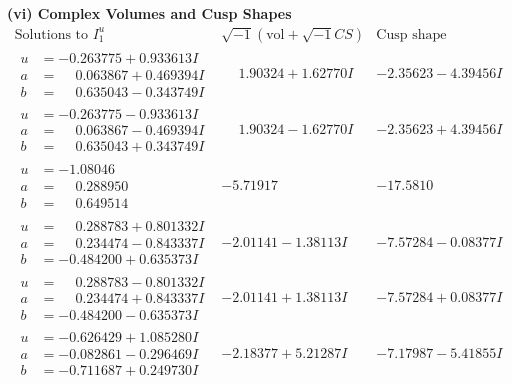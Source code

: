 \documentclass[1p]{elsarticle_modified}
\theoremstyle{definition}
\newcommand{\I}{\sqrt{-1}}
\begin{document}
\newpage\flushleft \textbf{(vi) Complex Volumes and Cusp Shapes}
$$\begin{array}{c|c|c}  
\text{Solutions to }I^u_{1}& \I (\text{vol} + \sqrt{-1}CS) & \text{Cusp shape}\\
 \hline 
\begin{aligned}
u &= -0.263775 + 0.933613 I \\
a &= \phantom{-}0.063867 + 0.469394 I \\
b &= \phantom{-}0.635043 - 0.343749 I\end{aligned}
 & \phantom{-}1.90324 + 1.62770 I & -2.35623 - 4.39456 I \\ \hline\begin{aligned}
u &= -0.263775 - 0.933613 I \\
a &= \phantom{-}0.063867 - 0.469394 I \\
b &= \phantom{-}0.635043 + 0.343749 I\end{aligned}
 & \phantom{-}1.90324 - 1.62770 I & -2.35623 + 4.39456 I \\ \hline\begin{aligned}
u &= -1.08046\phantom{ +0.000000I} \\
a &= \phantom{-}0.288950\phantom{ +0.000000I} \\
b &= \phantom{-}0.649514\phantom{ +0.000000I}\end{aligned}
 & -5.71917\phantom{ +0.000000I} & -17.5810\phantom{ +0.000000I} \\ \hline\begin{aligned}
u &= \phantom{-}0.288783 + 0.801332 I \\
a &= \phantom{-}0.234474 - 0.843337 I \\
b &= -0.484200 + 0.635373 I\end{aligned}
 & -2.01141 - 1.38113 I & -7.57284 - 0.08377 I \\ \hline\begin{aligned}
u &= \phantom{-}0.288783 - 0.801332 I \\
a &= \phantom{-}0.234474 + 0.843337 I \\
b &= -0.484200 - 0.635373 I\end{aligned}
 & -2.01141 + 1.38113 I & -7.57284 + 0.08377 I \\ \hline\begin{aligned}
u &= -0.626429 + 1.085280 I \\
a &= -0.082861 - 0.296469 I \\
b &= -0.711687 + 0.249730 I\end{aligned}
 & -2.18377 + 5.21287 I & -7.17987 - 5.41855 I \\ \hline\begin{aligned}

\end{aligned}
\end{array}$$
\end{document}
